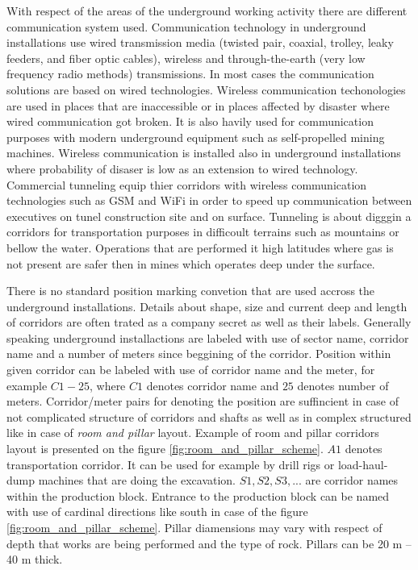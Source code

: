 \documentclass[../main.tex]{subfiles}
\begin{document}
With respect of the areas of the underground working activity there are different communication system used. Communication technology in underground installations use wired transmission media (twisted pair, coaxial, trolley, leaky feeders, and fiber optic cables), wireless and through-the-earth (very low frequency radio methods) transmissions. In most cases the communication solutions are based on wired technologies. Wireless communication techonologies are used in places that are inaccessible or in places affected by disaster where wired communication got broken. It is also havily used for communication purposes with modern underground equipment such as self-propelled mining machines. Wireless communication is installed also in underground installations where probability of disaser is low as an extension to wired technology. Commercial tunneling equip thier corridors with wireless communication technologies such as GSM and WiFi in order to speed up communication between executives on tunel construction site and on surface. Tunneling is about digggin a corridors for transportation purposes in difficoult terrains such as mountains or bellow the water. Operations that are performed it high latitudes where gas is not present are safer then in mines which operates deep under the surface.

There is no standard position marking convetion that are used accross the underground installations. Details about shape, size and current deep and length of corridors are often trated as a company secret as well as their labels. Generally speaking underground installactions are labeled with use of sector name, corridor name and a number of meters since beggining of the corridor. Position within given corridor can be labeled with use of corridor name and the meter, for example $C1-25$, where $C1$ denotes corridor name and $25$ denotes number of meters. Corridor/meter pairs for denoting the position are suffincient in case of not complicated structure of corridors and shafts as well as in complex structured like in case of \textit{room and pillar} layout. Example of room and pillar corridors layout is presented on the figure \ref{fig:room_and_pillar_scheme}. $A1$ denotes transportation corridor. It can be used for example by drill rigs or load-haul-dump machines that are doing the excavation. $S1, S2, S3, ...$ are corridor names within the production block. Entrance to the production block can be named with use of cardinal directions like south in case of the figure \ref{fig:room_and_pillar_scheme}. Pillar diamensions may vary with respect of depth that works are being performed and the type of rock. Pillars can be 20 m -- 40 m thick.
\end{document}
